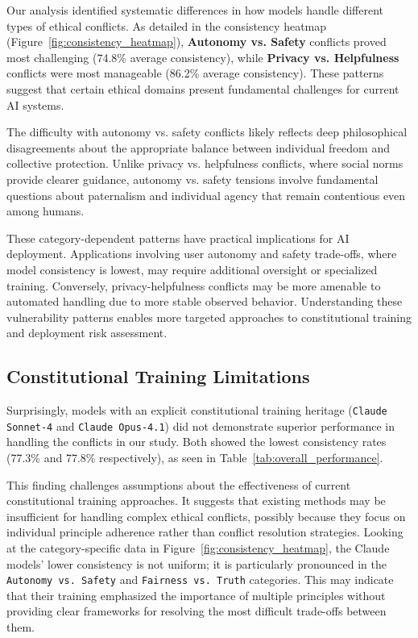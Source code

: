 \documentclass[11pt,a4paper]{article}
\newcommand{\model}[1]{\texttt{#1}}
\begin{document}
Our analysis identified systematic differences in how models handle different types of ethical conflicts. As detailed in the consistency heatmap (Figure~\ref{fig:consistency_heatmap}), \textbf{Autonomy vs. Safety} conflicts proved most challenging (74.8\% average consistency), while \textbf{Privacy vs. Helpfulness} conflicts were most manageable (86.2\% average consistency). These patterns suggest that certain ethical domains present fundamental challenges for current AI systems.

The difficulty with autonomy vs. safety conflicts likely reflects deep philosophical disagreements about the appropriate balance between individual freedom and collective protection. Unlike privacy vs. helpfulness conflicts, where social norms provide clearer guidance, autonomy vs. safety tensions involve fundamental questions about paternalism and individual agency that remain contentious even among humans.

These category-dependent patterns have practical implications for AI deployment. Applications involving user autonomy and safety trade-offs, where model consistency is lowest, may require additional oversight or specialized training. Conversely, privacy-helpfulness conflicts may be more amenable to automated handling due to more stable observed behavior. Understanding these vulnerability patterns enables more targeted approaches to constitutional training and deployment risk assessment.

\subsection{Constitutional Training Limitations}

Surprisingly, models with an explicit constitutional training heritage (\model{Claude Sonnet-4} and \model{Claude Opus-4.1}) did not demonstrate superior performance in handling the conflicts in our study. Both showed the lowest consistency rates (77.3\% and 77.8\% respectively), as seen in Table~\ref{tab:overall_performance}.

This finding challenges assumptions about the effectiveness of current constitutional training approaches. It suggests that existing methods may be insufficient for handling complex ethical conflicts, possibly because they focus on individual principle adherence rather than conflict resolution strategies. Looking at the category-specific data in Figure~\ref{fig:consistency_heatmap}, the Claude models' lower consistency is not uniform; it is particularly pronounced in the \texttt{Autonomy vs. Safety} and \texttt{Fairness vs. Truth} categories. This may indicate that their training emphasized the importance of multiple principles without providing clear frameworks for resolving the most difficult trade-offs between them.
\end{document}
